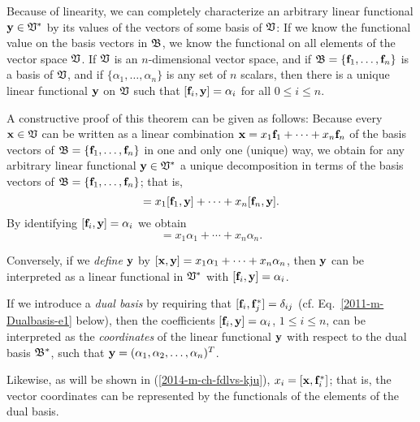 Because of linearity, we can completely characterize an arbitrary linear functional
${\bf y} \in {\frak V}^*$ by its values of the vectors of some basis of ${\frak V}$:
If we know the functional value on the basis vectors in ${\frak B}$, we know the functional
on all elements of the vector space ${\frak V}$.
If ${\frak V}$ is an $n$-dimensional vector space, and if ${\frak B} = \{{\bf f}_1,\ldots , {\bf f}_n\}$
is a basis of  ${\frak V}$, and if
$\{\alpha_1, \ldots ,\alpha_n\}$  is any set of $n$ scalars, then there is
a unique linear functional ${\bf y}$  on  ${\frak V}$ such that
$ [ {\bf f}_i, {\bf y}] = \alpha_i $ for all $0\le i \le n$.

{\color{OliveGreen}
\bproof
A constructive proof  of this theorem can be given as follows:
Because every ${\bf x}\in {\frak V}$
can be written as a linear combination $ {\bf x} = x_1 {\bf f}_1 +\cdots + x_n {\bf f}_n$
of the basis vectors of ${\frak B} = \{{\bf f}_1,\ldots , {\bf f}_n\}$
in one and only one (unique) way, we obtain for any arbitrary linear functional ${\bf y} \in {\frak V}^*$  a unique decomposition
in terms of the basis vectors of  ${\frak B} = \{{\bf f}_1,\ldots , {\bf f}_n\}$; that is,
\begin{equation}
[{\bf x},{\bf y}]
=
x_1 [{\bf f}_1 ,{\bf y}] +\cdots + x_n [{\bf f}_n ,{\bf y}] .
\end{equation}
By identifying  $[{\bf f}_i ,{\bf y}]=\alpha_i$ we obtain
\begin{equation}
[{\bf x},{\bf y}]
=
x_1 \alpha_1 +\cdots + x_n \alpha_n .
\end{equation}
\eproof
}

Conversely, if we {\em define} ${\bf y}$ by $[{\bf x},{\bf y}] = x_1\alpha_1 + \cdots + x_n\alpha_n$, then ${\bf y}$
can be interpreted as a linear functional in ${\frak V}^*$ with $[{\bf f}_i,{\bf y}] = \alpha_i$.

If we introduce a {\em dual basis}
by requiring that $[{\bf f}_i,  {\bf f}_j^*]=\delta_{ij}$ (cf. Eq.~\ref{2011-m-Dualbasis-e1} below),
then the coefficients $[{\bf f}_i ,{\bf y}] = \alpha_i$,
$1\le i \le n$, can be interpreted
as the {\em coordinates} of the linear functional ${\bf y}$ with respect to the dual
basis ${\frak B}^\ast$, such that ${\bf y}=(\alpha_1,\alpha_2,\ldots , \alpha_n)^T$.

Likewise, as will be shown in (\ref{2014-m-ch-fdlvs-kju}),
$
x_i =
 [{\bf x},{\bf f}_i^*]
$; that is, the vector coordinates can be represented by the functionals of the elements of the dual basis.


